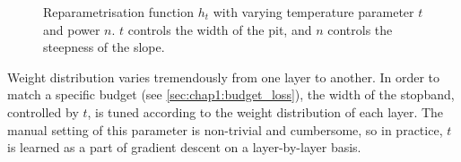\begin{figure}
  \centering
    \caption{
    Reparametrisation function $h_t$ with varying temperature parameter $t$ and
    power $n$. $t$ controls the width of the pit, and $n$ controls the steepness
    of the slope.}
  \label{fig:stopband}
\end{figure}

Weight distribution varies tremendously from one layer to another. In order to
match a specific budget (see \cref{sec:chap1:budget_loss}), the width of the
stopband, controlled by $t$, is tuned according to the weight distribution of
each layer. The manual setting of this parameter is non-trivial and cumbersome,
so in practice, $t$ is learned as a part of gradient descent on a layer-by-layer
basis.\\

